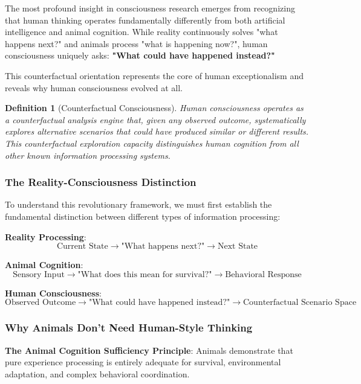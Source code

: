 \documentclass[12pt,a4paper]{article}
\newtheorem{definition}[theorem]{Definition}
\begin{document}
The most profound insight in consciousness research emerges from recognizing that human thinking operates fundamentally differently from both artificial intelligence and animal cognition. While reality continuously solves "what happens next?" and animals process "what is happening now?", human consciousness uniquely asks: \textbf{"What could have happened instead?"}

This counterfactual orientation represents the core of human exceptionalism and reveals why human consciousness evolved at all.

\begin{definition}[Counterfactual Consciousness]
Human consciousness operates as a counterfactual analysis engine that, given any observed outcome, systematically explores alternative scenarios that could have produced similar or different results. This counterfactual exploration capacity distinguishes human cognition from all other known information processing systems.
\end{definition}

\subsubsection{The Reality-Consciousness Distinction}

To understand this revolutionary framework, we must first establish the fundamental distinction between different types of information processing:

\textbf{Reality Processing}:
$$\text{Current State} \rightarrow \text{"What happens next?"} \rightarrow \text{Next State}$$

\textbf{Animal Cognition}:
$$\text{Sensory Input} \rightarrow \text{"What does this mean for survival?"} \rightarrow \text{Behavioral Response}$$

\textbf{Human Consciousness}:
$$\text{Observed Outcome} \rightarrow \text{"What could have happened instead?"} \rightarrow \text{Counterfactual Scenario Space}$$

\subsubsection{Why Animals Don't Need Human-Style Thinking}

\textbf{The Animal Cognition Sufficiency Principle}: Animals demonstrate that pure experience processing is entirely adequate for survival, environmental adaptation, and complex behavioral coordination.
\end{document}
